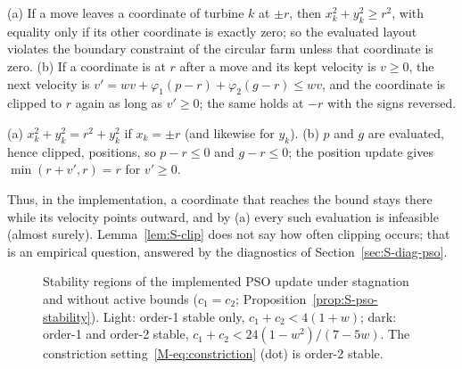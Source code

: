 \begin{lemS}
\label{lem:S-clip}
(a) If a move leaves a coordinate of turbine $k$ at $\pm r$, then $x_k^2+y_k^2\ge r^2$, with equality only if its other coordinate is exactly zero; so the evaluated layout violates the boundary constraint of the circular farm unless that coordinate is zero. (b) If a coordinate is at $r$ after a move and its kept velocity is $v\ge0$, the next velocity is $v'=wv+\varphi_1(p-r)+\varphi_2(g-r)\le wv$, and the coordinate is clipped to $r$ again as long as $v'\ge0$; the same holds at $-r$ with the signs reversed.
\end{lemS}
\begin{thSproof}
(a) $x_k^2+y_k^2=r^2+y_k^2$ if $x_k=\pm r$ (and likewise for $y_k$). (b) $p$ and $g$ are evaluated, hence clipped, positions, so $p-r\le0$ and $g-r\le0$; the position update gives $\min(r+v',r)=r$ for $v'\ge0$.
\end{thSproof}
Thus, in the implementation, a coordinate that reaches the bound stays there while its velocity points outward, and by (a) every such evaluation is infeasible (almost surely). Lemma~\ref{lem:S-clip} does not say how often clipping occurs; that is an empirical question, answered by the diagnostics of Section~\ref{sec:S-diag-pso}.

\begin{figure}[!htbp]
\begin{minipage}[c]{0.44\textwidth}\centering
{}
\end{minipage}\hfill
\begin{minipage}[c]{0.53\textwidth}
\caption{Stability regions of the implemented PSO update under stagnation and without active bounds ($c_1=c_2$; Proposition~\ref{prop:S-pso-stability}). Light: order-1 stable only, $c_1+c_2<4(1+w)$; dark: order-1 and order-2 stable, $c_1+c_2<24(1-w^2)/(7-5w)$. The constriction setting~\eqref{M-eq:constriction} (dot) is order-2 stable.}
\label{fig:S-th-stability}
\end{minipage}
\end{figure}

